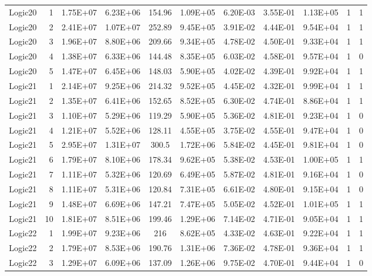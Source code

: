 \begin{longtable}{@{}l!{\vrule}r!{\vrule}c!{\vrule}c!{\vrule}c!{\vrule}c!{\vrule}c!{\vrule}c!{\vrule}c!{\vrule}c!{\vrule}c@{}}
Logic20 & 1 & 1.75E+07 & 6.23E+06 & 154.96 & 1.09E+05 & 6.20E-03 & 3.55E-01 & 1.13E+05 & 1 & 1 \\
Logic20 & 2 & 2.41E+07 & 1.07E+07 & 252.89 & 9.45E+05 & 3.91E-02 & 4.44E-01 & 9.54E+04 & 1 & 1 \\
Logic20 & 3 & 1.96E+07 & 8.80E+06 & 209.66 & 9.34E+05 & 4.78E-02 & 4.50E-01 & 9.33E+04 & 1 & 1 \\
Logic20 & 4 & 1.38E+07 & 6.33E+06 & 144.48 & 8.35E+05 & 6.03E-02 & 4.58E-01 & 9.57E+04 & 1 & 0 \\
Logic20 & 5 & 1.47E+07 & 6.45E+06 & 148.03 & 5.90E+05 & 4.02E-02 & 4.39E-01 & 9.92E+04 & 1 & 1 \\
\hline
Logic21 & 1 & 2.14E+07 & 9.25E+06 & 214.32 & 9.52E+05 & 4.45E-02 & 4.32E-01 & 9.99E+04 & 1 & 1 \\
Logic21 & 2 & 1.35E+07 & 6.41E+06 & 152.65 & 8.52E+05 & 6.30E-02 & 4.74E-01 & 8.86E+04 & 1 & 1 \\
Logic21 & 3 & 1.10E+07 & 5.29E+06 & 119.29 & 5.90E+05 & 5.36E-02 & 4.81E-01 & 9.23E+04 & 1 & 0 \\
Logic21 & 4 & 1.21E+07 & 5.52E+06 & 128.11 & 4.55E+05 & 3.75E-02 & 4.55E-01 & 9.47E+04 & 1 & 0 \\
Logic21 & 5 & 2.95E+07 & 1.31E+07 & 300.5 & 1.72E+06 & 5.84E-02 & 4.45E-01 & 9.81E+04 & 1 & 0 \\
Logic21 & 6 & 1.79E+07 & 8.10E+06 & 178.34 & 9.62E+05 & 5.38E-02 & 4.53E-01 & 1.00E+05 & 1 & 1 \\
Logic21 & 7 & 1.11E+07 & 5.32E+06 & 120.69 & 6.49E+05 & 5.87E-02 & 4.81E-01 & 9.16E+04 & 1 & 0 \\
Logic21 & 8 & 1.11E+07 & 5.31E+06 & 120.84 & 7.31E+05 & 6.61E-02 & 4.80E-01 & 9.15E+04 & 1 & 0 \\
Logic21 & 9 & 1.48E+07 & 6.69E+06 & 147.21 & 7.47E+05 & 5.05E-02 & 4.52E-01 & 1.01E+05 & 1 & 1 \\
Logic21 & 10 & 1.81E+07 & 8.51E+06 & 199.46 & 1.29E+06 & 7.14E-02 & 4.71E-01 & 9.05E+04 & 1 & 1 \\
\hline
{}
Logic22 & 1 & 1.99E+07 & 9.23E+06 & 216 & 8.62E+05 & 4.33E-02 & 4.63E-01 & 9.22E+04 & 1 & 1 \\
Logic22 & 2 & 1.79E+07 & 8.53E+06 & 190.76 & 1.31E+06 & 7.36E-02 & 4.78E-01 & 9.36E+04 & 1 & 1 \\
Logic22 & 3 & 1.29E+07 & 6.09E+06 & 137.09 & 1.26E+06 & 9.75E-02 & 4.70E-01 & 9.44E+04 & 1 & 0 \\

\end{longtable}
